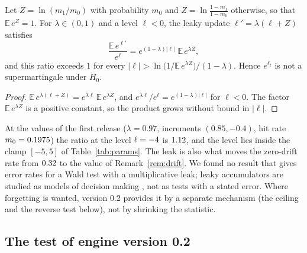 \begin{proposition}\label{prop:leak}
Let $Z=\ln(m_1/m_0)$ with probability $m_0$ and $Z=\ln\frac{1-m_1}{1-m_0}$ otherwise, so that $\mathbb{E}\,e^{Z}=1$. For $\lambda\in(0,1)$ and a level $\ell<0$, the leaky update $\ell'=\lambda(\ell+Z)$ satisfies
\[
  \frac{\mathbb{E}\,e^{\ell'}}{e^{\ell}}=e^{(1-\lambda)|\ell|}\;\mathbb{E}\,e^{\lambda Z},
\]
and this ratio exceeds $1$ for every $|\ell|>\ln\!\big(1/\mathbb{E}\,e^{\lambda Z}\big)/(1-\lambda)$. Hence $e^{\ell_t}$ is not a supermartingale under $H_0$.
\end{proposition}
\begin{proof}
$\mathbb{E}\,e^{\lambda(\ell+Z)}=e^{\lambda\ell}\,\mathbb{E}\,e^{\lambda Z}$, and $e^{\lambda\ell}/e^{\ell}=e^{(1-\lambda)|\ell|}$ for $\ell<0$. The factor $\mathbb{E}\,e^{\lambda Z}$ is a positive constant, so the product grows without bound in $|\ell|$.
\end{proof}
At the values of the first release ($\lambda=0.97$, increments $(0.85,-0.4)$, hit rate $m_0=0.1975$) the ratio at the level $\ell=-4$ is $1.12$, and the level lies inside the clamp $[-5,5]$ of Table~\ref{tab:params}. The leak is also what moves the zero-drift rate from $0.32$ to the value of Remark~\ref{rem:drift}. We found no result that gives error rates for a Wald test with a multiplicative leak; leaky accumulators are studied as models of decision making \citep{bogacz2006physics}, not as tests with a stated error. Where forgetting is wanted, version 0.2 provides it by a separate mechanism (the ceiling and the reverse test below), not by shrinking the statistic.

\subsection{The test of engine version 0.2}\label{subsec:sprtengine}

